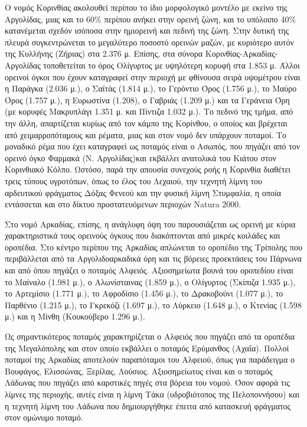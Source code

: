 \documentclass[12pt]{article}
\begin{document}
	Ο νομός Κορινθίας ακολουθεί περίπου το ίδιο μορφολογικό μοντέλο με εκείνο της Αργολίδας, μιας και το 60\% περίπου ανήκει στην ορεινή ζώνη, και το υπόλοιπο 40\% κατανέμεται σχεδόν ισόποσα στην ημιορεινή και πεδινή της ζώνη. Στην δυτική της πλευρά συγκεντρώνεται το μεγαλύτερο ποσοστό ορεινών μαζών, με κυριότερο αυτόν της Κυλλήνης (Ζήριας) στα 2.376 μ. Επίσης, στα σύνορα Κορινθίας-Αρκαδίας-Αργολίδας τοποθετείται το όρος Ολίγυρτος με υψηλότερη κορυφή στα 1.853 μ. Άλλοι ορεινοί όγκοι που έχουν καταγραφεί στην περιοχή με φθίνουσα σειρά υψομέτρου είναι η Παράγκα (2.036 μ.), ο Σαϊτάς (1.814 μ.), το Γερόντιο Όρος (1.756 μ.), το Μαύρο Όρος (1.757 μ.), η Ευρωστίνα (1.208), ο Γαβριάς (1.209 μ.) και τα Γεράνεια Όρη (με κορυφές Μακρυπλάγι 1.351 μ. και Πίντιζα 1.032 μ.). Το πεδινό της τμήμα, από την άλλη, απαρτίζεται κυρίως από τον κάμπο της Κορίνθου, ο οποίος και βρέχεται από χειμαρροπόταμους και ρέματα, μιας και στον νομό δεν υπάρχουν ποταμοί. Το μοναδικό ρέμα που έχει καταγραφεί ως ποταμός είναι ο Ασωπός, που πηγάζει από τον ορεινό όγκο Φαρμακά (Ν. Αργολίδας)και εκβάλλει ανατολικά του Κιάτου στον Κορινθιακό Κόλπο. Ωστόσο, παρά την απουσία συνεχούς ροής η Κορινθία διαθέτει τρεις τύπους υγροτόπων, όπως το έλος του Λεχαιού, την τεχνητή λίμνη του αρδευτικού φράγματος Δόξας Φενεού και την φυσική λίμνη Στυμφαλία, η οποία εντάσσεται και στο δίκτυο προστατευόμενων περιοχών Natura 2000.
	
	Στο νομό Αρκαδίας, επίσης, η ανάγλυφη όψη του παρουσιάζεται ως ορεινή με κύρια χαρακτηριστικά τους ορεινούς όγκους που διακόπτονται από μικρές κοιλάδες και οροπέδια. Στο κέντρο περίπου της Αρκαδίας απλώνεται το οροπέδιο της Τρίπολης που περιβάλλεται από τα Αργολιδοαρκαδικά όρη και τις βόρειες προεκτάσεις του Πάρνωνα και από όπου πηγάζει ο ποταμός Αλφειός. Αξιοσημείωτα βουνά του οροπεδίου είναι το Μαίναλο (1.981 μ.), ο Αλωνίσταινας (1.859 μ.), ο Ολίγυρτος (Σκίπιζα 1.935 μ.), το Αρτεμίσιο (1.771 μ.), το Αφροδίσιο (1.456 μ.), το Δρακοβούνι (1.077 μ.), το Παρθένιο (1.215 μ.), το Γκρεκόζι (1.697 μ.), το Λύρκειο (1.648 μ.), ο Κτενίας (1.598 μ.) και η Μίνθη (Κουκούβερο 1.296 μ.).
	
	Ως σημαντικότερος ποταμός χαρακτηρίζεται  ο Αλφειός που πηγάζει από τα οροπέδια της Μεγαλόπολης και στον οποίο εκβάλλει ο ποταμός Ερύμανθος (Αχαΐα). Πολλοί ποταμοί της Αρκαδίας αποτελούν παραπόταμοι του Αλφειού, όπως για παράδειγμα ο Βουφάγος, Ελισσώνας, Ξερίλας, Λούσιος. Αξιοσημείωτος είναι και  ο ποταμός Λάδωνας που πηγάζει από καρστικές πηγές στα βόρεια του νομού. Όσον αφορά τις λίμνες της περιοχής, αυτές είναι η λίμνη Τάκα (υδροβιότοπος της Πελοποννήσου) και η τεχνητή λίμνη του Λάδωνα που δημιουργήθηκε έπειτα από κατασκευή φράγματος στον ομώνυμο ποταμό. 
	
\end{document}
